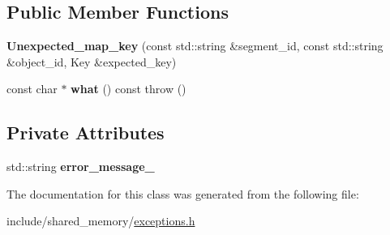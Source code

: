 \subsection*{Public Member Functions}
\begin{DoxyCompactItemize}
\item 
\mbox{\label{classshared__memory_1_1Unexpected__map__key_a6b186f98c6978fb264529381b3174c9d}} 
{\bfseries Unexpected\+\_\+map\+\_\+key} (const std\+::string \&segment\+\_\+id, const std\+::string \&object\+\_\+id, Key \&expected\+\_\+key)
\item 
\mbox{\label{classshared__memory_1_1Unexpected__map__key_a6c33648c021589f76d33f75b3cef9550}} 
const char $\ast$ {\bfseries what} () const  throw ()
\end{DoxyCompactItemize}
\subsection*{Private Attributes}
\begin{DoxyCompactItemize}
\item 
\mbox{\label{classshared__memory_1_1Unexpected__map__key_a67c2b43bc3b41b5584c7fba92acac5cc}} 
std\+::string {\bfseries error\+\_\+message\+\_\+}
\end{DoxyCompactItemize}


The documentation for this class was generated from the following file\+:\begin{DoxyCompactItemize}
\item 
include/shared\+\_\+memory/\hyperlink{exceptions_8h}{exceptions.\+h}\end{DoxyCompactItemize}
